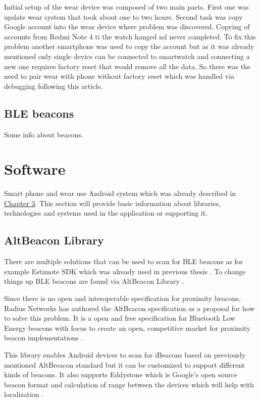 Initial setup of the wear device was composed of two main parts. First one was update wear system that took about one to two hours. Second task was copy Google account into the wear device where problem was discovered. Copying of accounts from Redmi Note 4 ti the watch hanged nd never completed. To fix this problem another smartphone was used to copy the account but as it was already mentioned only single device can be connected to smartwatch and connecting a new one requires factory reset that would remove all the data. So there was the need to pair wear with phone without factory reset which was handled via debugging following this \cite{HtPAWW} article.

\subsection{BLE beacons}\label{subsec:BLEBeacons}
Some info about beacons.

\section{Software}\label{sec:Software}
Smart phone and wear use Android system which was already described in \hyperref[sec:Android]{Chapter 3}. This section will provide basic information about libraries, technologies and systems used in the application or supporting it.

\subsection{AltBeacon Library}\label{subsec:AltBeaconLibrary}
There are multiple solutions that can be used to scan for BLE beacons as for example Estimote SDK \cite{ESDKfA} which was already used in previous thesis \cite{PMRIL}. To change things up BLE beacons are found via AltBeacon Library \cite{ABL}.

Since there is no open and interoperable specification for proximity beacons, Radius Networks has authored the AltBeacon specification as a proposal for how to solve this problem. It is a open and free specification for Bluetooth Low Energy beacons with focus to create an open, competitive market for proximity beacon implementations \cite{AltB}.

This library enables Android devices to scan for iBeacons based on previously mentioned AltBreacon standard but it can be customized to support different kinds of beacons. It also supports Eddystone which is Google's open source beacon format and calculation of range between the devices which will help with localization \cite{ABL, EDDF}.

